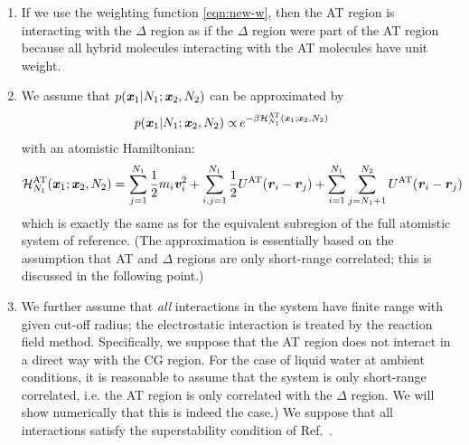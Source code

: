 \documentclass[aps,a4paper,reprint,onecolumn]{revtex4}
\newcommand{\vect}[1]{\textbf{\textit{#1}}}
\newcommand{\AT}{{\textrm{{AT}}}}
\newcommand{\HY}{{\Delta}}
\begin{document}
\begin{enumerate}

\item If we use the weighting function \eqref{eqn:new-w},
then the AT region is interacting with the $\HY$ region
as if the $\HY$ region were part of the AT region because
all hybrid molecules interacting with the AT molecules have unit weight.

\item We assume that $p(\vect x_1 | N_1; \vect x_2, N_2)$  can be approximated by
\begin{align}\label{eqn:p-1-1}
  p(\vect x_1 | N_1; \vect x_2, N_2)
  \propto &\,
  e^{-\beta\mathcal H_{N_1}^{\AT}(\vect x_1; \vect x_2, N_2)}
\end{align}
with an atomistic Hamiltonian:
\begin{align}\label{eqn:p-1-2}
  \mathcal H_{N_1}^{{\AT}}(\vect x_1; \vect x_2, N_2) = &\,
  \sum_{j=1}^{N_1}\frac12 m_i\vect v_i^2 + 
  \sum_{i,j=1}^{N_1}\frac12 U^{{\AT}}(\vect r_i - \vect r_j)  +
  \sum_{i=1}^{N_1}\sum_{j=N_1+1}^{N_2} U^{{\AT}}(\vect r_i - \vect r_j)   
\end{align}
which is exactly the same as for the equivalent subregion of the full atomistic system of reference. (The approximation is essentially based on the assumption that AT and $\Delta$ regions are only short-range correlated; this is discussed in the following point.)

\item We further assume that \emph{all} interactions in the system have finite range with given cut-off radius; the
  electrostatic interaction is treated by the reaction field method. Specifically, we suppose that 
  the AT region does not interact in a direct way with the CG region.
  For the case of liquid water at ambient conditions, it is reasonable to assume that the system is only short-range correlated, i.e. the AT region is only correlated with the $\HY$ region. We will show numerically that this is indeed the case.)
  We suppose that all interactions satisfy the superstability condition of Ref.~.
  


\end{enumerate}
\end{document}
